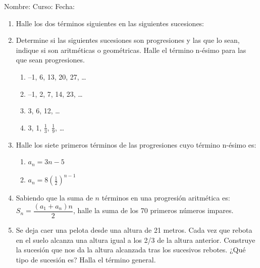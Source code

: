 \documentclass[fleqn]{article}
\newcommand{\LineaNombre}{%
\par
\vspace{\baselineskip}
Nombre:\hrulefill \; Curso: \underline{\hspace*{48pt}} \; Fecha: \underline{\hspace*{2.5cm}} \relax
\par}
\begin{document}
\LineaNombre
\begin{enumerate}
 \item Halle los dos términos siguientes en las siguientes sucesiones:
 \begin{enumerate}
 \end{enumerate}
 \item Determine si las siguientes sucesiones son progresiones y las que lo sean, indique si son aritméticas o geométricas. Halle el término n-ésimo para las que sean progresiones.
 \begin{enumerate}
 \item --1, 6, 13, 20, 27, \ldots \noanswer
 \item --1, 2, 7, 14, 23, \ldots \noanswer
 \item 3, 6, 12, \ldots \noanswer
 \item 3, 1, $\frac{1}{3}$, $\frac{1}{9}$, \ldots \noanswer
 \end{enumerate}
 \item Halle los siete primeros términos de las progresiones cuyo término n-ésimo es:
 \begin{enumerate}
 \item $a_{n}=3n-5$\noanswer[0.25in]
 \item $a_{n}=8(\frac{1}{2})^{n-1}$ \noanswer[0.25in]
 \end{enumerate}
 \newpage
 \item Sabiendo que la suma de $n$ términos en una progresión aritmética es: $S_{n}=\dfrac{(a_{1}+a_{n})n}{2}$, halle la suma de los 70 primeros números impares.\noanswer
 \item Se deja caer una pelota desde una altura de 21 metros. Cada vez que rebota en el suelo alcanza una altura igual a los 2/3 de la altura anterior. Construye la sucesión que nos da la altura alcanzada tras los sucesivos rebotes. ¿Qué tipo de sucesión es? Halla el término general.\noanswer
 \end{enumerate}
\end{document}
